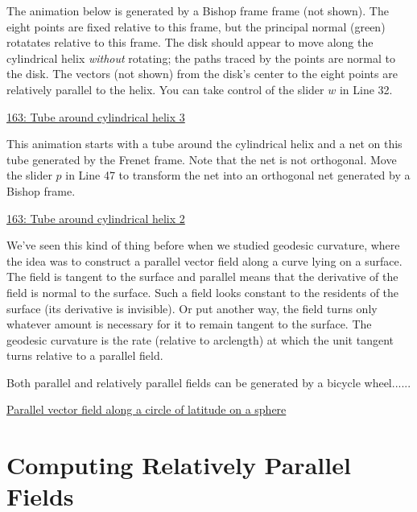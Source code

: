 \documentclass{ximera}
\begin{document}
\begin{exploration}
The animation below is generated by a Bishop frame frame (not shown). The eight points are fixed relative to this frame, but the principal normal (green) rotatates relative to this frame. The disk should appear to move along the cylindrical helix \emph{without} rotating; the paths traced by the points are normal to the disk. The vectors (not shown) from the disk's center to the eight points are relatively parallel to the helix. You can take control of the slider $w$ in Line 32.

\href{https://www.desmos.com/3d/fg6l58x6tl}{163: Tube around cylindrical helix 3}
\end{exploration}

\begin{exploration}
This animation starts with a tube around the cylindrical helix and a net on this tube generated by the Frenet frame. Note that the net is not orthogonal. Move the slider $p$ in Line 47 to transform the net into an orthogonal net generated by a Bishop frame.

\href{https://www.desmos.com/3d/agzievbron}{163: Tube around cylindrical helix 2}
\end{exploration}

We've seen this kind of thing before when we studied geodesic curvature, where the idea was to construct a parallel vector field along a curve lying on a surface. The field is tangent to the surface and parallel means that the derivative of the field is normal to the surface. Such a field looks constant to the residents of the surface (its derivative is invisible). Or put another way, the field turns only whatever amount is necessary for it to remain tangent to the surface. The geodesic curvature is the rate (relative to arclength) at which the unit tangent turns relative to a parallel field.

Both parallel and relatively parallel fields can be generated by a bicycle wheel......

\begin{exploration}
\href{https://www.desmos.com/3d/frbiiccyfd}{Parallel vector field along a circle of latitude on a sphere}
\end{exploration}




\section*{Computing Relatively Parallel Fields}
\end{document}
